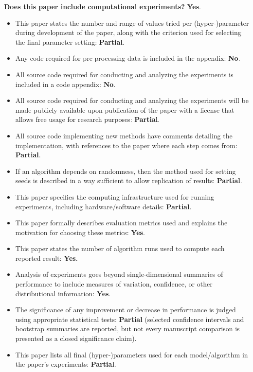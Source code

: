 \documentclass[letterpaper]{article}
\begin{document}
\noindent\textbf{Does this paper include computational experiments?} \textbf{Yes}.
\begin{itemize}
\item This paper states the number and range of values tried per (hyper-)parameter during development of the paper, along with the criterion used for selecting the final parameter setting: \textbf{Partial}.
\item Any code required for pre-processing data is included in the appendix: \textbf{No}.
\item All source code required for conducting and analyzing the experiments is included in a code appendix: \textbf{No}.
\item All source code required for conducting and analyzing the experiments will be made publicly available upon publication of the paper with a license that allows free usage for research purposes: \textbf{Partial}.
\item All source code implementing new methods have comments detailing the implementation, with references to the paper where each step comes from: \textbf{Partial}.
\item If an algorithm depends on randomness, then the method used for setting seeds is described in a way sufficient to allow replication of results: \textbf{Partial}.
\item This paper specifies the computing infrastructure used for running experiments, including hardware/software details: \textbf{Partial}.
\item This paper formally describes evaluation metrics used and explains the motivation for choosing these metrics: \textbf{Yes}.
\item This paper states the number of algorithm runs used to compute each reported result: \textbf{Yes}.
\item Analysis of experiments goes beyond single-dimensional summaries of performance to include measures of variation, confidence, or other distributional information: \textbf{Yes}.
\item The significance of any improvement or decrease in performance is judged using appropriate statistical tests: \textbf{Partial} (selected confidence intervals and bootstrap summaries are reported, but not every manuscript comparison is presented as a closed significance claim).
\item This paper lists all final (hyper-)parameters used for each model/algorithm in the paper's experiments: \textbf{Partial}.
\end{itemize}
\end{document}

